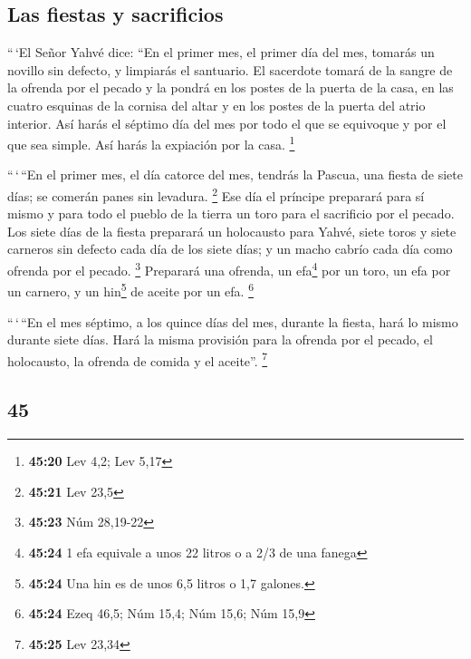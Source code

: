 \begin{paracol}{2}
\hypertarget{las-fiestas-y-sacrificios}{%
\subsection{Las fiestas y sacrificios}\label{las-fiestas-y-sacrificios}}

 ``\,`El Señor Yahvé dice: ``En el primer mes, el primer
día del mes, tomarás un novillo sin defecto, y limpiarás el santuario.
 El sacerdote tomará de la sangre de la ofrenda por el
pecado y la pondrá en los postes de la puerta de la casa, en las cuatro
esquinas de la cornisa del altar y en los postes de la puerta del atrio
interior.  Así harás el séptimo día del mes por todo el
que se equivoque y por el que sea simple. Así harás la expiación por la
casa. \footnote{\textbf{45:20} Lev 4,2; Lev 5,17}

 ``\,`\,``En el primer mes, el día catorce del mes,
tendrás la Pascua, una fiesta de siete días; se comerán panes sin
levadura. \footnote{\textbf{45:21} Lev 23,5}  Ese día el
príncipe preparará para sí mismo y para todo el pueblo de la tierra un
toro para el sacrificio por el pecado.  Los siete días de
la fiesta preparará un holocausto para Yahvé, siete toros y siete
carneros sin defecto cada día de los siete días; y un macho cabrío cada
día como ofrenda por el pecado. \footnote{\textbf{45:23} Núm 28,19-22}
 Preparará una ofrenda, un efa\footnote{\textbf{45:24} 1
  efa equivale a unos 22 litros o a 2/3 de una fanega} por un toro, un
efa por un carnero, y un hin\footnote{\textbf{45:24} Una hin es de unos
  6,5 litros o 1,7 galones.} de aceite por un efa. \footnote{\textbf{45:24}
  Ezeq 46,5; Núm 15,4; Núm 15,6; Núm 15,9}

 ``\,`\,``En el mes séptimo, a los quince días del mes,
durante la fiesta, hará lo mismo durante siete días. Hará la misma
provisión para la ofrenda por el pecado, el holocausto, la ofrenda de
comida y el aceite''. \footnote{\textbf{45:25} Lev 23,34}

\switchcolumn
\begin{otherlanguage}{english}

\hypertarget{section-89}{%
\section{45}\label{section-89}}


\end{otherlanguage}
\end{paracol}
